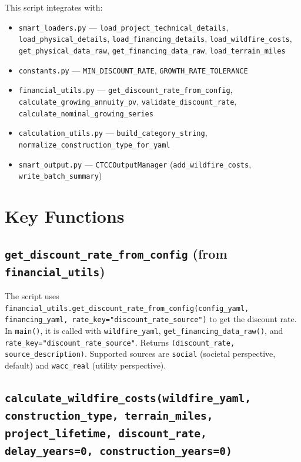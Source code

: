 \documentclass[ctcc_full_documentation.tex]{subfiles}
\begin{document}
This script integrates with:
\begin{itemize}
    \item \texttt{smart\_loaders.py} --- \texttt{load\_project\_technical\_details}, \texttt{load\_physical\_details}, \texttt{load\_financing\_details}, \texttt{load\_wildfire\_costs}, \texttt{get\_physical\_data\_raw}, \texttt{get\_financing\_data\_raw}, \texttt{load\_terrain\_miles}
    \item \texttt{constants.py} --- \texttt{MIN\_DISCOUNT\_RATE}, \texttt{GROWTH\_RATE\_TOLERANCE}
    \item \texttt{financial\_utils.py} --- \texttt{get\_discount\_rate\_from\_config}, \texttt{calculate\_growing\_annuity\_pv}, \texttt{validate\_discount\_rate}, \texttt{calculate\_nominal\_growing\_series}
    \item \texttt{calculation\_utils.py} --- \texttt{build\_category\_string}, \texttt{normalize\_construction\_type\_for\_yaml}
    \item \texttt{smart\_output.py} --- \texttt{CTCCOutputManager} (\texttt{add\_wildfire\_costs}, \texttt{write\_batch\_summary})
\end{itemize}

\section{Key Functions}

\subsection{\texttt{get\_discount\_rate\_from\_config} (from \texttt{financial\_utils})}

The script uses \texttt{financial\_utils.get\_discount\_rate\_from\_config(config\_yaml, financing\_yaml, rate\_key="discount\_rate\_source")} to get the discount rate. In \texttt{main()}, it is called with \texttt{wildfire\_yaml}, \texttt{get\_financing\_data\_raw()}, and \texttt{rate\_key="discount\_rate\_source"}. Returns \texttt{(discount\_rate, source\_description)}. Supported sources are \texttt{social} (societal perspective, default) and \texttt{wacc\_real} (utility perspective).

\subsection{\texttt{calculate\_wildfire\_costs(wildfire\_yaml, construction\_type, terrain\_miles, project\_lifetime, discount\_rate, delay\_years=0, construction\_years=0)}}
\end{document}
